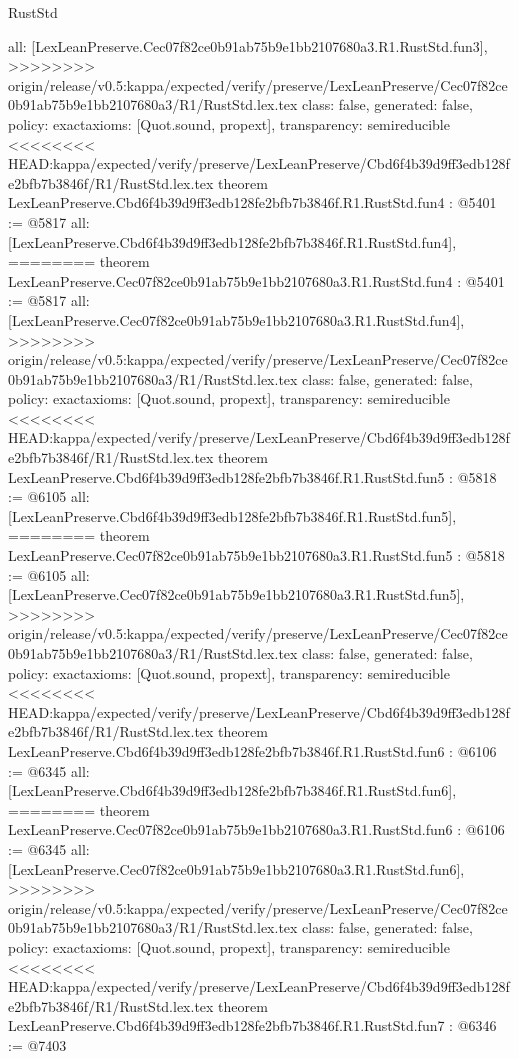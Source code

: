 \begin{lexlean}{RustStd}
\begin{coremodule}
{\begin{coremodule}
{{{{{{{  all: [LexLeanPreserve.Cec07f82ce0b91ab75b9e1bb2107680a3.R1.RustStd.fun3],
>>>>>>>> origin/release/v0.5:kappa/expected/verify/preserve/LexLeanPreserve/Cec07f82ce0b91ab75b9e1bb2107680a3/R1/RustStd.lex.tex
  class: false,
  generated: false,
  policy: exact{axioms: [Quot.sound, propext]},
  transparency: semireducible
}
<<<<<<<< HEAD:kappa/expected/verify/preserve/LexLeanPreserve/Cbd6f4b39d9ff3edb128fe2bfb7b3846f/R1/RustStd.lex.tex
theorem LexLeanPreserve.Cbd6f4b39d9ff3edb128fe2bfb7b3846f.R1.RustStd.fun4 : @5401 := @5817 {
  all: [LexLeanPreserve.Cbd6f4b39d9ff3edb128fe2bfb7b3846f.R1.RustStd.fun4],
========
theorem LexLeanPreserve.Cec07f82ce0b91ab75b9e1bb2107680a3.R1.RustStd.fun4 : @5401 := @5817 {
  all: [LexLeanPreserve.Cec07f82ce0b91ab75b9e1bb2107680a3.R1.RustStd.fun4],
>>>>>>>> origin/release/v0.5:kappa/expected/verify/preserve/LexLeanPreserve/Cec07f82ce0b91ab75b9e1bb2107680a3/R1/RustStd.lex.tex
  class: false,
  generated: false,
  policy: exact{axioms: [Quot.sound, propext]},
  transparency: semireducible
}
<<<<<<<< HEAD:kappa/expected/verify/preserve/LexLeanPreserve/Cbd6f4b39d9ff3edb128fe2bfb7b3846f/R1/RustStd.lex.tex
theorem LexLeanPreserve.Cbd6f4b39d9ff3edb128fe2bfb7b3846f.R1.RustStd.fun5 : @5818 := @6105 {
  all: [LexLeanPreserve.Cbd6f4b39d9ff3edb128fe2bfb7b3846f.R1.RustStd.fun5],
========
theorem LexLeanPreserve.Cec07f82ce0b91ab75b9e1bb2107680a3.R1.RustStd.fun5 : @5818 := @6105 {
  all: [LexLeanPreserve.Cec07f82ce0b91ab75b9e1bb2107680a3.R1.RustStd.fun5],
>>>>>>>> origin/release/v0.5:kappa/expected/verify/preserve/LexLeanPreserve/Cec07f82ce0b91ab75b9e1bb2107680a3/R1/RustStd.lex.tex
  class: false,
  generated: false,
  policy: exact{axioms: [Quot.sound, propext]},
  transparency: semireducible
}
<<<<<<<< HEAD:kappa/expected/verify/preserve/LexLeanPreserve/Cbd6f4b39d9ff3edb128fe2bfb7b3846f/R1/RustStd.lex.tex
theorem LexLeanPreserve.Cbd6f4b39d9ff3edb128fe2bfb7b3846f.R1.RustStd.fun6 : @6106 := @6345 {
  all: [LexLeanPreserve.Cbd6f4b39d9ff3edb128fe2bfb7b3846f.R1.RustStd.fun6],
========
theorem LexLeanPreserve.Cec07f82ce0b91ab75b9e1bb2107680a3.R1.RustStd.fun6 : @6106 := @6345 {
  all: [LexLeanPreserve.Cec07f82ce0b91ab75b9e1bb2107680a3.R1.RustStd.fun6],
>>>>>>>> origin/release/v0.5:kappa/expected/verify/preserve/LexLeanPreserve/Cec07f82ce0b91ab75b9e1bb2107680a3/R1/RustStd.lex.tex
  class: false,
  generated: false,
  policy: exact{axioms: [Quot.sound, propext]},
  transparency: semireducible
}
<<<<<<<< HEAD:kappa/expected/verify/preserve/LexLeanPreserve/Cbd6f4b39d9ff3edb128fe2bfb7b3846f/R1/RustStd.lex.tex
theorem LexLeanPreserve.Cbd6f4b39d9ff3edb128fe2bfb7b3846f.R1.RustStd.fun7 : @6346 := @7403 {
}}}}}}}}}}
\end{coremodule}}
\end{coremodule}
\end{lexlean}
